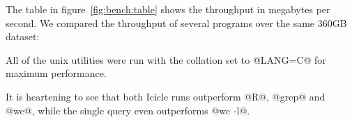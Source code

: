 The table in figure~\ref{fig:bench:table} shows the throughput in megabytes per second.
We compared the throughput of several programs over the same 360GB dataset:
All of the unix utilities were run with the collation set to @LANG=C@ for maximum performance.

It is heartening to see that both Icicle runs outperform @R@, @grep@ and @wc@, while the single query even outperforms @wc -l@.

